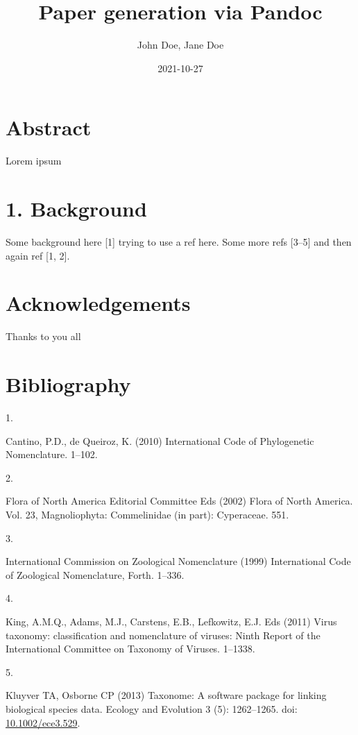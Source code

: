 \documentclass[
]{article}
\title{Paper generation via Pandoc}
\author{John Doe, Jane Doe}
\date{2021-10-27}
\newlength{\cslhangindent}
\newlength{\csllabelwidth}
\newlength{\cslentryspacingunit} %
\newenvironment{CSLReferences}[2] %
 {%
  \setlength{\parindent}{0pt}
  \ifodd #1
  \let\oldpar\par
  \def\par{\hangindent=\cslhangindent\oldpar}
  \fi
  \setlength{\parskip}{#2\cslentryspacingunit}
 }%
 {}
\newcommand{\CSLLeftMargin}[1]{\parbox[t]{\csllabelwidth}{#1}}
\newcommand{\CSLRightInline}[1]{\parbox[t]{\linewidth - \csllabelwidth}{#1}\break}
\begin{document}
\maketitle

\hypertarget{abstract}{%
\section{Abstract}\label{abstract}}

Lorem ipsum

\hypertarget{background}{%
\section{1. Background}\label{background}}

Some background here {[}1{]} trying to use a ref here. Some more refs
{[}3--5{]} and then again ref {[}1, 2{]}.

\hypertarget{acknowledgements}{%
\section{Acknowledgements}\label{acknowledgements}}

Thanks to you all

\hypertarget{bibliography}{%
\section*{Bibliography}\label{bibliography}}

\hypertarget{refs}{}
\begin{CSLReferences}{0}{0}
\leavevmode{}%
\CSLLeftMargin{1. }
\CSLRightInline{Cantino, P.D., de Queiroz, K. (2010) {International Code
of Phylogenetic Nomenclature}. 1--102.}

\leavevmode{}%
\CSLLeftMargin{2. }
\CSLRightInline{Flora of North America Editorial Committee Eds (2002)
{Flora of North America. Vol. 23, Magnoliophyta: Commelinidae (in part):
Cyperaceae}. 551.}

\leavevmode{}%
\CSLLeftMargin{3. }
\CSLRightInline{International Commission on Zoological Nomenclature
(1999) {International Code of Zoological Nomenclature}, Forth. 1--336.}

\leavevmode{}%
\CSLLeftMargin{4. }
\CSLRightInline{King, A.M.Q., Adams, M.J., Carstens, E.B., Lefkowitz,
E.J. Eds (2011) {Virus taxonomy: classification and nomenclature of
viruses: Ninth Report of the International Committee on Taxonomy of
Viruses.} 1--1338.}

\leavevmode{}%
\CSLLeftMargin{5. }
\CSLRightInline{Kluyver TA, Osborne CP (2013) Taxonome: A software
package for linking biological species data. Ecology and Evolution 3
(5): 1262--1265. doi:
\href{https://doi.org/10.1002/ece3.529}{10.1002/ece3.529}.}

\end{CSLReferences}
\end{document}
